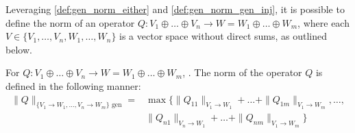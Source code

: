 Leveraging \autoref{def:gen_norm_either} and \autoref{def:gen_norm_gen_inj}, it is possible to define the norm of an operator $Q: V_1 \oplus \ldots \oplus V_n  \rightarrow W = W_1 \oplus \ldots \oplus W_m$, where each $V \in \{V_1, \ldots, V_n, W_1, \ldots, W_n\}$ is a vector space without direct sums, as outlined below.
\begin{definition}
  For $Q: V_1 \oplus \ldots \oplus V_n  \rightarrow W = W_1 \oplus \ldots \oplus W_m$, .  The norm of the operator $Q$ is defined in the following manner:
  \begin{equation}
    \begin{split}
    \|Q\|_{\{V_1\rightarrow W_1, \ldots, V_n\rightarrow W_m\} \text{ gen}} = & \max \{\|Q_{11}\|_{V_1 \rightarrow W_1} + \ldots + \|Q_{1m}\|_{V_1 \rightarrow W_m}, \ldots, \\ 
    & \|Q_{n1}\|_{V_n \rightarrow W_1} + \ldots + \|Q_{nm}\|_{V_1 \rightarrow W_m}  \}
    \end{split}
  \end{equation}
\end{definition}




